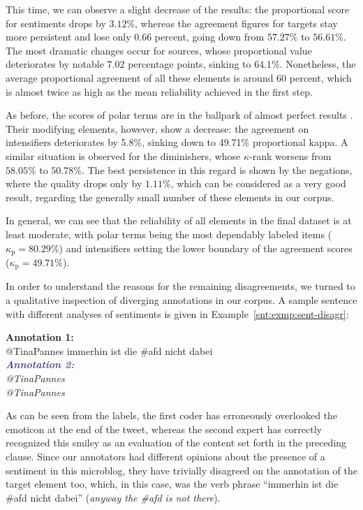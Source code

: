 This time, we can observe a slight decrease of the results: the
proportional score for sentiments drops by $3.12\%$, whereas the
agreement figures for targets stay more persistent and lose only 0.66
percent, going down from $57.27\%$ to $56.61\%$.  The most dramatic
changes occur for sources, whose proportional value deteriorates by
notable $7.02$ percentage points, sinking to $64.1\%$.  Nonetheless,
the average proportional agreement of all these elements is around 60
percent, which is almost twice as high as the mean reliability
achieved in the first step.

As before, the scores of polar terms are in the ballpark of
almost perfect results \cite[see][]{Landis:77}.  Their modifying
elements, however, show a decrease: the agreement on intensifiers
deteriorates by 5.8\%, sinking down to 49.71\% proportional kappa.  A
similar situation is observed for the diminishers, whose $\kappa$-rank
worsens from $58.05\%$ to $50.78\%$.  The best persistence in this
regard is shown by the negations, where the quality drops only by
$1.11\%$, which can be considered as a very good result, regarding the
generally small number of these elements in our corpus.

In general, we can see that the reliability of all elements in the
final dataset is at least moderate, with polar terms being
the most dependably labeled items ($\kappa_{\textrm{p}}=80.29\%$) and
intensifiers setting the lower boundary of the agreement scores
($\kappa_{\textrm{p}}=49.71\%$).

In order to understand the reasons for the remaining disagreements, we
turned to a qualitative inspection of diverging annotations in our
corpus.  A sample sentence with different analyses of sentiments is
given in Example~\ref{snt:exmp:sent-disagr}:
\begin{example}\label{snt:exmp:sent-disagr}
  \textcolor{red3}{\textbf{Annotation 1:}}\\ \upshape{}@TinaPannes
  immerhin ist die \#afd nicht dabei \smiley{}\\[0.8em]\itshape
  \noindent\textcolor{darkslateblue}{\textbf{\itshape Annotation
      2:}}\\ \upshape{}@TinaPannes
  \\[0.8em]
  \noindent\itshape{}@TinaPannes
  \upshape{}
\end{example}
As can be seen from the labels, the first coder has erroneously
overlooked the emoticon \smiley{} at the end of the tweet, whereas the
second expert has correctly recognized this smiley as an evaluation of
the content set forth in the preceding clause.  Since our annotators
had different opinions about the presence of a sentiment in this
microblog, they have trivially disagreed on the annotation of the
target element too, which, in this case, was the verb phrase
``immerhin ist die \#afd nicht dabei'' (\emph{anyway the \#afd is not
  there}).


